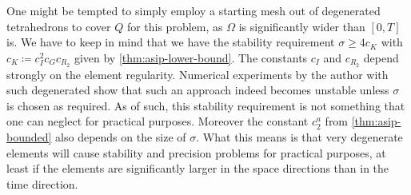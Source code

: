 \documentclass[../thesis.tex]{subfiles}
\begin{document}
One might be tempted to simply employ a starting mesh out of degenerated tetrahedrons to cover $Q$ for this problem, as $\Omega$ is significantly wider than $[0, T]$ is. 
We have to keep in mind that we have the stability requirement $\sigma \geq 4 c_K$ with $c_K \coloneqq c_I^2 c_G c_{R_2}$ given by \cref{thm:asip-lower-bound}. The constants $c_I$ and $c_{R_2}$ depend strongly on the element regularity.
Numerical experiments by the author with such degenerated show that such an approach indeed becomes unstable unless $\sigma$ is chosen as required. As of such, this stability requirement is not something that one can neglect for practical purposes.
Moreover the constant $c_2^a$ from \cref{thm:asip-bounded} also depends on the size of $\sigma$.
What this means is that very degenerate elements will cause stability and precision problems for practical purposes, at least if the elements are significantly larger in the space directions than in the time direction.
\end{document}
